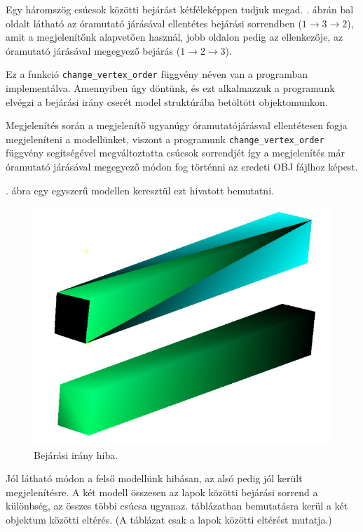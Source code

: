 Egy háromszög csúcsok közötti bejárást kétféleképpen tudjuk megad. . ábrán bal oldalt látható az óramutató járásával ellentétes bejárási sorrendben ($1 \rightarrow 3 \rightarrow 2$), amit a megjelenítőnk alapvetően használ, jobb oldalon pedig az ellenkezője, az óramutató járásával megegyező bejárás ($1 \rightarrow 2 \rightarrow 3$).

Ez a funkció \texttt{change\_vertex\_order} függvény néven van a programban implementálva. Amennyiben úgy döntünk, és ezt alkalmazzuk a programunk elvégzi a bejárási irány cserét model struktúrába betöltött objektomunkon.

Megjelenítés során a megjelenítő ugyanúgy óramutatójárásval ellentétesen fogja megjeleníteni a modellünket, viszont a programunk \texttt{change\_vertex\_order} függvény segítségével megváltoztatta csúcsok sorrendjét így a megjelenítés már óramutató járásával megegyező módon fog történni az eredeti OBJ fájlhoz képest.

. ábra egy egyszerű modellen keresztül ezt hivatott bemutatni.

\begin{figure}[h]
\centering
\includegraphics[scale=0.5]{images/order.png}
\caption{Bejárási irány hiba.}
\label{fig:bej2}
\end{figure}

Jól látható módon a felső modellünk hibásan, az alsó pedig jól került megjelenítésre. A két modell összesen az lapok közötti bejárási sorrend a különbség, az összes többi csúcsa ugyanaz.  táblázatban bemutatásra kerül a két objektum közötti eltérés. (A táblázat csak a lapok közötti eltérést mutatja.)

